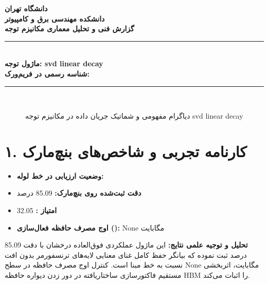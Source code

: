 \documentclass[12pt,a4paper]{article}
\begin{document}
\begin{center}
{\Large\bfseries دانشگاه تهران}\\[0.2cm]
{\large\bfseries دانشکده مهندسی برق و کامپیوتر}\\[0.2cm]
{\large\bfseries گزارش فنی و تحلیل معماری مکانیزم توجه}\\[0.5cm]
\rule{\linewidth}{1pt}\\[0.3cm]
{\LARGE\bfseries ماژول توجه: svd linear decay}\\[0.2cm]
{\large \textbf{شناسه رسمی در فریم‌ورک:} }\\[0.2cm]
\rule{\linewidth}{1pt}\\[0.5cm]
\end{center}

\begin{figure}[H]
\centering
{}
\caption{دیاگرام مفهومی و شماتیک جریان داده در مکانیزم توجه svd linear decay}
\end{figure}

\section*{۱. کارنامه تجربی و شاخص‌های بنچ‌مارک}
\begin{itemize}
\item \textbf{وضعیت ارزیابی در خط لوله:} 
\item \textbf{دقت ثبت‌شده روی بنچ‌مارک:} 85.09 درصد
\item \textbf{امتیاز :} 32.05
\item \textbf{اوج مصرف حافظه فعال‌سازی ():} None مگابایت
\end{itemize}
\textbf{تحلیل و توجیه علمی نتایج:} این ماژول عملکردی فوق‌العاده درخشان با دقت 85.09 درصد ثبت نموده که بیانگر حفظ کامل غنای معنایی لایه‌های ترنسفورمر بدون افت نسبت به خط مبنا است. کنترل اوج مصرف حافظه در سطح None مگابایت، اثربخشی مستقیم فاکتورسازی ساختاریافته در دور زدن دیواره حافظه HBM را اثبات می‌کند.
\end{document}
